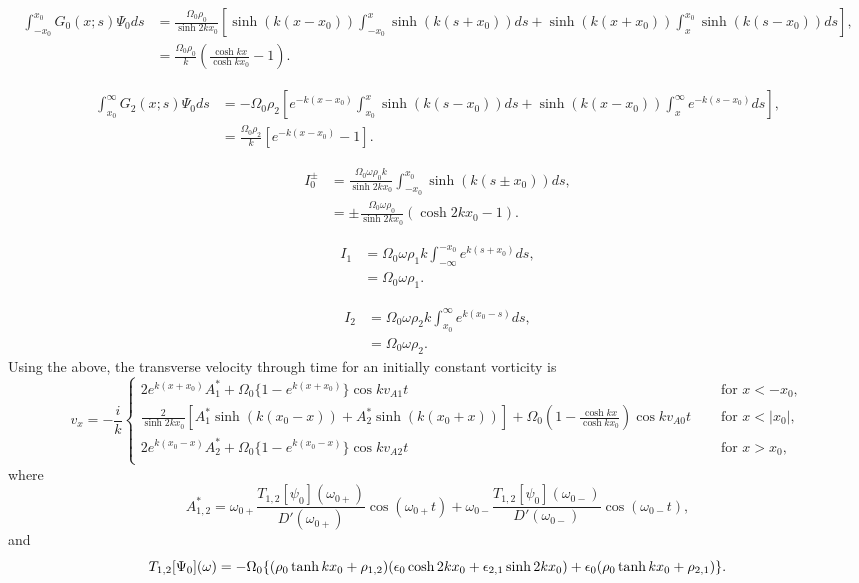 \documentclass{aastex61}
\begin{document}
	\begin{align}
	\int_{-x_0}^{x_0} G_0(x;s) \Psi_0 ds &= \frac{\Omega_0 \rho_0}{\sinh{2kx_0}} \left[ \sinh(k(x-x_0)) \int_{-x_0}^{x} \sinh(k(s+x_0)) ds + \sinh(k(x+x_0)) \int_{x}^{x_0} \sinh(k(s-x_0)) ds \right], \\
	&= \frac{\Omega_0 \rho_0}{k} \left( \frac{\cosh{kx}}{\cosh{kx_0}} - 1 \right).
	\end{align}
	
	\begin{align}
	\int_{x_0}^{\infty} G_2(x;s) \Psi_0 ds &= - \Omega_0 \rho_2 \left[ e^{-k(x-x_0)} \int_{x_0}^{x} \sinh(k(s-x_0)) ds + \sinh(k(x-x_0)) \int_{x}^{\infty} e^{-k(s-x_0)} ds \right], \\
	&= \frac{\Omega_0 \rho_2}{k} \left[ e^{-k(x-x_0)} - 1 \right].
	\end{align}

\begin{align}
I_0^\pm &= \frac{\Omega_0\omega\rho_0k}{\sinh{2kx_0}} \int_{-x_0}^{x_0} \sinh(k(s \pm x_0)) ds, \\
&= \pm \frac{\Omega_0 \omega \rho_0}{\sinh{2kx_0}} (\cosh{2kx_0 - 1}).
\end{align}

\begin{align}
I_1 &= \Omega_0\omega\rho_1k \int_{-\infty}^{-x_0} e^{k(s + x_0)} ds, \\
&= \Omega_0 \omega \rho_1.
\end{align}

\begin{align}
I_2 &= \Omega_0\omega\rho_2k \int_{x_0}^{\infty} e^{k(x_0 - s)} ds, \\
&= \Omega_0 \omega \rho_2.
\end{align}
Using the above, the transverse velocity through time for an initially constant vorticity is
\begin{equation}
v_x = -\frac{i}{k}\begin{cases}
2 e^{k(x+x_0)} A^*_1 + \Omega_0 \{1 - e^{k(x+x_0)}\} \cos{kv_{A1}t} \quad &\text{ for } x<-x_0, \\
\frac{2}{\sinh{2kx_0}} \left[ A^*_1 \sinh(k(x_0 - x)) + A^*_2 \sinh(k(x_0 + x)) \right] + \Omega_0 \left( 1 - \frac{\cosh{kx}}{\cosh{kx_0}} \right)\cos{kv_{A0}t} \quad &\text{ for } x<|x_0|, \\
2 e^{k(x_0-x)} A^*_2 + \Omega_0 \{1 - e^{k(x_0-x)}\} \cos{kv_{A2}t} \quad &\text{ for } x>x_0, \\
\end{cases}
\end{equation}
where
\begin{equation}
A^*_{1,2} = \omega_{0+} \frac{T_{1,2}[\psi_0](\omega_{0+})}{D'(\omega_{0+})} \cos(\omega_{0+} t) + \omega_{0-}\frac{T_{1,2}[\psi_0](\omega_{0-})}{D'(\omega_{0-})} \cos(\omega_{0-} t),
\end{equation}
and
\begin{equation}
T_{1,2}[\Psi_0](\omega) = -\Omega_0\{ (\rho_0 \tanh{kx_0} + \rho_{1,2}) (\e_0 \cosh{2kx_0} + \e_{2,1}\sinh{2kx_0}) + \e_0(\rho_0 \tanh{kx_0} + \rho_{2,1}) \}.
\end{equation}
\end{document}
